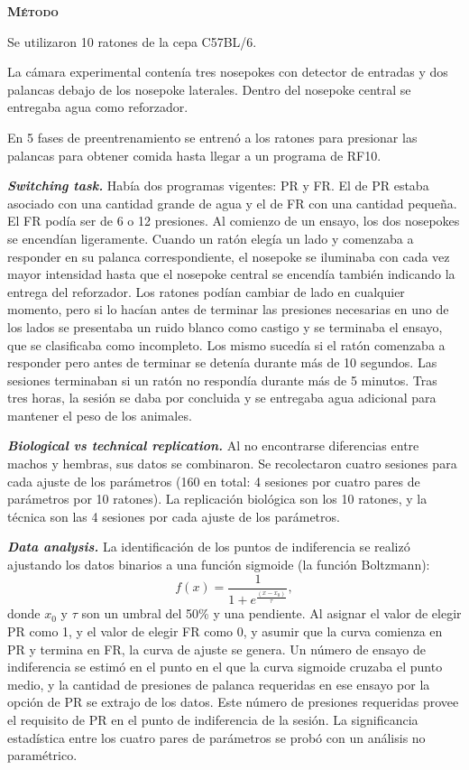 \documentclass[a4paper,12pt]{article}
\begin{document}
{\scshape\bfseries Método}

Se utilizaron 10 ratones de la cepa C57BL/6.

La cámara experimental contenía tres nosepokes con detector de entradas y dos palancas debajo de los nosepoke laterales. Dentro del nosepoke central se entregaba agua como reforzador. 

En 5 fases de preentrenamiento se entrenó a los ratones para presionar las palancas para obtener comida hasta llegar a un programa de RF10.

{\itshape\bfseries Switching task.} Había dos programas vigentes: PR y FR. El de PR estaba asociado con una cantidad grande de agua y el de FR con una cantidad pequeña. El FR podía ser de 6 o 12 presiones. Al comienzo de un ensayo, los dos nosepokes se encendían ligeramente. Cuando un ratón elegía un lado y comenzaba a responder en su palanca correspondiente, el nosepoke se iluminaba con cada vez mayor intensidad hasta que el nosepoke central se encendía también indicando la entrega del reforzador. Los ratones podían cambiar de lado en cualquier momento, pero si lo hacían antes de terminar las presiones necesarias en uno de los lados se presentaba un ruido blanco como castigo y se terminaba el ensayo, que se clasificaba como incompleto. Los mismo sucedía si el ratón comenzaba a responder pero antes de terminar se detenía durante más de 10 segundos. Las sesiones terminaban si un ratón no respondía durante más de 5 minutos. Tras tres horas, la sesión se daba por concluida y se entregaba agua adicional para mantener el peso de los animales.

{\itshape\bfseries Biological vs technical replication.} Al no encontrarse diferencias entre machos y hembras, sus datos se combinaron. Se recolectaron cuatro sesiones para cada ajuste de los parámetros (160 en total: 4 sesiones por cuatro pares de parámetros por 10 ratones). La replicación biológica son los 10 ratones, y la técnica son las 4 sesiones por cada ajuste de los parámetros.

{\itshape\bfseries Data analysis.} La identificación de los puntos de indiferencia se realizó ajustando los datos binarios a una función sigmoide (la función Boltzmann):
$$
f(x) = \frac{1}{1+e^{\frac{(x-x_0)}{\tau}}},
$$
donde $x_0$ y $\tau$ son un umbral del 50\% y una pendiente. Al asignar el valor de elegir PR como 1, y el valor de elegir FR como 0, y asumir que la curva comienza en PR y termina en FR, la curva de ajuste se genera. Un número de ensayo de indiferencia se estimó en el punto en el que la curva sigmoide cruzaba el punto medio, y la cantidad de presiones de palanca requeridas en ese ensayo por la opción de PR se extrajo de los datos. Este número de presiones requeridas provee el requisito de PR en el punto de indiferencia de la sesión. La significancia estadística entre los cuatro pares de parámetros se probó con un análisis no paramétrico. 
\end{document}
